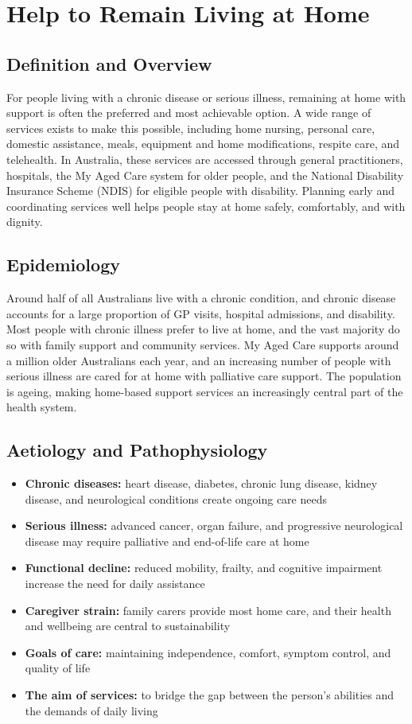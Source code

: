 \chapter{Help to Remain Living at Home}

\section*{Definition and Overview}
For people living with a chronic disease or serious illness, remaining at home with support is often the preferred and most achievable option. A wide range of services exists to make this possible, including home nursing, personal care, domestic assistance, meals, equipment and home modifications, respite care, and telehealth. In Australia, these services are accessed through general practitioners, hospitals, the My Aged Care system for older people, and the National Disability Insurance Scheme (NDIS) for eligible people with disability. Planning early and coordinating services well helps people stay at home safely, comfortably, and with dignity.

\section*{Epidemiology}
Around half of all Australians live with a chronic condition, and chronic disease accounts for a large proportion of GP visits, hospital admissions, and disability. Most people with chronic illness prefer to live at home, and the vast majority do so with family support and community services. My Aged Care supports around a million older Australians each year, and an increasing number of people with serious illness are cared for at home with palliative care support. The population is ageing, making home-based support services an increasingly central part of the health system.

\section*{Aetiology and Pathophysiology}
\begin{itemize}
    \item \textbf{Chronic diseases:} heart disease, diabetes, chronic lung disease, kidney disease, and neurological conditions create ongoing care needs
    \item \textbf{Serious illness:} advanced cancer, organ failure, and progressive neurological disease may require palliative and end-of-life care at home
    \item \textbf{Functional decline:} reduced mobility, frailty, and cognitive impairment increase the need for daily assistance
    \item \textbf{Caregiver strain:} family carers provide most home care, and their health and wellbeing are central to sustainability
    \item \textbf{Goals of care:} maintaining independence, comfort, symptom control, and quality of life
    \item \textbf{The aim of services:} to bridge the gap between the person's abilities and the demands of daily living
\end{itemize}

